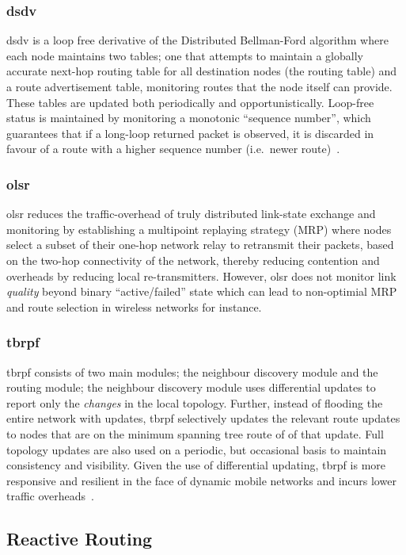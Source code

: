 {\subsubsection{\gls{dsdv}}
\acrlong{dsdv} is a loop free derivative of the Distributed Bellman-Ford algorithm where each node maintains two tables; one that attempts to maintain a globally accurate next-hop routing table for all destination nodes (the routing table) and a route advertisement table, monitoring routes that the node itself can provide. These tables are updated both periodically and opportunistically. Loop-free status is maintained by monitoring a monotonic ``sequence number'', which guarantees that if a long-loop returned packet is observed, it is discarded in favour of a route with a higher sequence number (i.e.\ newer route)~\cite{Perkins1994}.

\subsubsection{\gls{olsr}}
\acrlong{olsr} reduces the traffic-overhead of truly distributed link-state exchange and monitoring by establishing a multipoint replaying strategy (MRP) where nodes select a subset of their one-hop network relay to retransmit their packets, based on the two-hop connectivity of the network, thereby reducing contention and overheads by reducing local re-transmitters. However, \gls{olsr} does not monitor link \emph{quality} beyond binary ``active/failed'' state which can lead to non-optimial MRP and route selection in wireless networks for instance.

\subsubsection{\gls{tbrpf}}
\acrlong{tbrpf} consists of two main modules; the neighbour discovery module and the routing module; the neighbour discovery module uses differential updates to report only the \emph{changes} in the local topology. Further, instead of flooding the entire network with updates, \gls{tbrpf} selectively updates the relevant route updates to nodes that are on the minimum spanning tree route of of that update. Full topology updates are also used on a periodic, but occasional basis to maintain consistency and visibility. Given the use of differential updating, \gls{tbrpf} is more responsive and resilient in the face of dynamic mobile networks and incurs lower traffic overheads~\cite{Bellur1999}.

\subsection{Reactive Routing}

}
